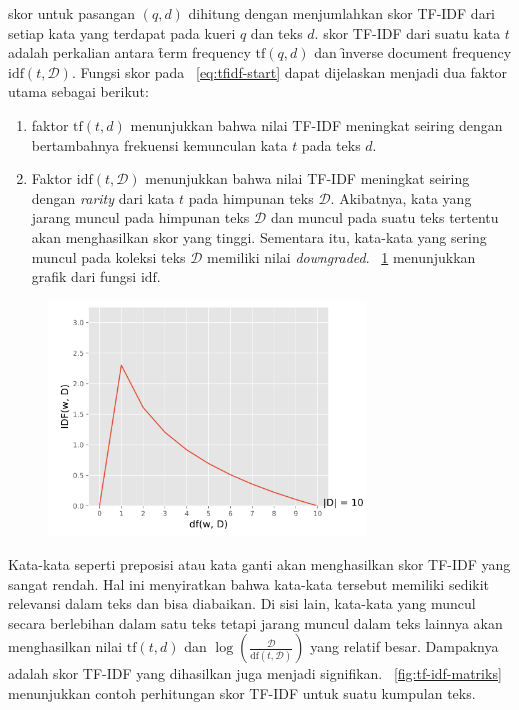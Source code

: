     skor untuk pasangan $(q,d)$ dihitung dengan menjumlahkan skor TF-IDF dari setiap kata yang terdapat pada kueri $q$ dan teks $d$. skor TF-IDF dari suatu kata $t$ adalah perkalian antara \f{term frequency} $\text{tf}(q,d)$ dan \f{inverse document frequency} $\text{idf}(t,\mathcal{D})$. Fungsi skor pada \equ~\ref{eq:tfidf-start} dapat dijelaskan menjadi dua faktor utama sebagai berikut:
    \begin{enumerate}
        \item faktor $\text{tf}(t, d)$ menunjukkan bahwa nilai TF-IDF meningkat seiring dengan bertambahnya frekuensi kemunculan kata $t$ pada teks $d$.
        \item Faktor $\text{idf}(t, \mathcal{D})$ menunjukkan bahwa nilai TF-IDF meningkat seiring dengan \textit{rarity} dari kata $t$ pada himpunan teks $\mathcal{D}$. Akibatnya, kata yang jarang muncul pada himpunan teks $\mathcal{D}$ dan muncul pada suatu teks tertentu akan menghasilkan skor yang tinggi. Sementara itu, kata-kata yang sering muncul pada koleksi teks $\mathcal{D}$ memiliki nilai \textit{downgraded}. \pic~\ref{fig:idf-graph} menunjukkan grafik dari fungsi $\text{idf}$.
    \end{enumerate}
    \begin{figure}
    \centering
    \includegraphics[width=0.75\textwidth]{assets/pics/idf-graph.png}
        \label{fig:idf-graph}
    \end{figure}

    Kata-kata seperti preposisi atau kata ganti akan menghasilkan skor TF-IDF yang sangat rendah. Hal ini menyiratkan bahwa kata-kata tersebut memiliki sedikit relevansi dalam teks dan bisa diabaikan. Di sisi lain, kata-kata yang muncul secara berlebihan dalam satu teks tetapi jarang muncul dalam teks lainnya akan menghasilkan nilai $\text{tf}(t, d)$ dan $\log \left(\frac{\mathcal{D}}{\text{df}(t, \mathcal{D})}\right)$ yang relatif besar. Dampaknya adalah skor TF-IDF yang dihasilkan juga menjadi signifikan. \pic~\ref{fig:tf-idf-matriks} menunjukkan contoh perhitungan skor TF-IDF untuk suatu kumpulan teks.

